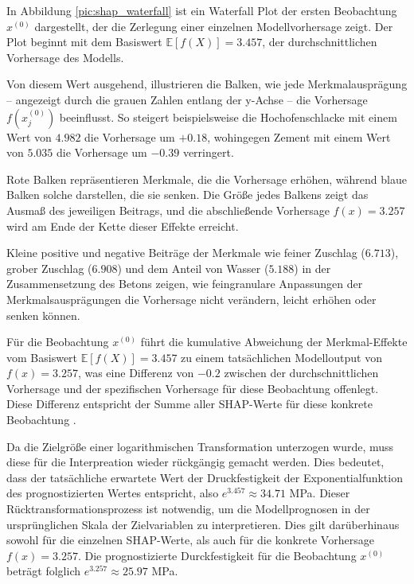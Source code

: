 In Abbildung \ref{pic:shap_waterfall} ist ein Waterfall Plot der ersten Beobachtung $x^{(0)}$ dargestellt, 
der die Zerlegung einer einzelnen Modellvorhersage zeigt. Der Plot beginnt mit dem Basiswert $\mathbb{E}[f(X)] = 3.457$, 
der durchschnittlichen Vorhersage des Modells. 

Von diesem Wert ausgehend, illustrieren die Balken, wie jede Merkmalausprägung – 
angezeigt durch die grauen Zahlen entlang der y-Achse – die Vorhersage $f(x_{j}^{(0)})$ beeinflusst. 
So steigert beispielsweise die Hochofenschlacke mit einem Wert von $4.982$ die Vorhersage um $+0.18$, 
wohingegen Zement mit einem Wert von $5.035$ die Vorhersage um $-0.39$ verringert.

Rote Balken repräsentieren Merkmale, die die Vorhersage erhöhen, während blaue Balken solche 
darstellen, die sie senken. Die Größe jedes Balkens zeigt das Ausmaß des jeweiligen Beitrags, 
und die abschließende Vorhersage $f(x) = 3.257$ wird am Ende der Kette dieser Effekte erreicht. 

Kleine positive und negative Beiträge der Merkmale wie feiner Zuschlag ($6.713$), grober Zuschlag ($6.908$) und dem Anteil von Wasser ($5.188$) 
in der Zusammensetzung des Betons zeigen, wie feingranulare Anpassungen der Merkmalsausprägungen die Vorhersage nicht verändern, 
leicht erhöhen oder senken können.

Für die Beobachtung $x^{(0)}$ führt die kumulative Abweichung der Merkmal-Effekte 
vom Basiswert $\mathbb{E}[f(X)] = 3.457$ zu einem tatsächlichen Modelloutput von $f(x) = 3.257$, 
was eine Differenz von $-0.2$ zwischen der durchschnittlichen Vorhersage 
und der spezifischen Vorhersage für diese Beobachtung offenlegt. 
Diese Differenz entspricht der Summe aller SHAP-Werte für diese konkrete Beobachtung \cite[S. 52f]{Molnar_2023}.

Da die Zielgröße einer logarithmischen Transformation unterzogen wurde, muss diese für die Interpreation wieder rückgängig gemacht werden. 
Dies bedeutet, dass der tatsächliche erwartete Wert der Druckfestigkeit der Exponentialfunktion des prognostizierten Wertes entspricht, also $e^{3.457} \approx 34.71$ MPa. 
Dieser Rücktransformationsprozess ist notwendig, um die Modellprognosen in der ursprünglichen Skala der Zielvariablen zu interpretieren.
Dies gilt darüberhinaus sowohl für die einzelnen SHAP-Werte, als auch für die konkrete Vorhersage $f(x) = 3.257$. 
Die prognostizierte Durckfestigkeit für die Beobachtung $x^{(0)}$ beträgt folglich $e^{3.257} \approx 25.97$ MPa.

